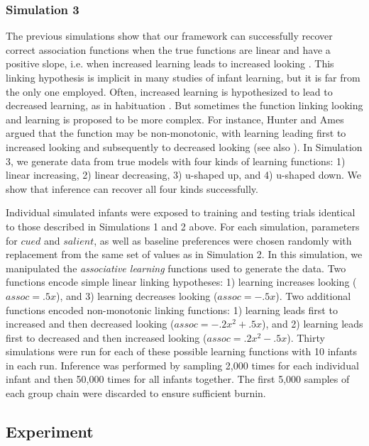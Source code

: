 \documentclass[12pt]{article}
\begin{document}
\subsubsection*{Simulation 3}

	The previous simulations show that our framework can successfully recover correct association functions when the true functions are linear and have a positive slope, i.e. when increased learning leads to increased looking \cite{Yu2011a}. This linking hypothesis is implicit in many studies of infant learning, but it is far from the only one employed. Often, increased learning is hypothesized to lead to decreased learning, as in habituation \cite{Fantz1964, Stager1997, Gilmore2002}. But sometimes the function linking looking and learning is proposed to be more complex. For instance, Hunter and Ames \cite{Hunter1988} argued that the function may be non-monotonic, with learning leading first to increased looking and subsequently to decreased looking (see also \cite{Cohen2004, Houston-Price2004}). In Simulation 3, we generate data from true models with four kinds of learning functions: 1) linear increasing, 2) linear decreasing, 3) u-shaped up, and 4) u-shaped down. We show that inference can recover all four kinds successfully. 

	Individual simulated infants were exposed to training and testing trials identical to those described in Simulations 1 and 2 above. For each simulation, parameters for $cued$ and $salient$, as well as baseline preferences were chosen randomly with replacement from the same set of values as in Simulation 2. In this simulation, we manipulated the \emph{associative learning} functions used to generate the data. Two functions encode simple linear linking hypotheses: 1) learning increases looking ($assoc = .5x$), and 3) learning decreases looking ($assoc = -.5x$). Two additional functions encoded non-monotonic linking functions: 1) learning leads first to increased and then decreased looking ($assoc = -.2x^{2} + .5x$), and 2) learning leads first to decreased and then increased looking ($assoc = .2x^{2} - .5x$). Thirty simulations were run for each of these possible learning functions with 10 infants in each run. Inference was performed by sampling 2,000 times for each individual infant and then 50,000 times for all infants together. The first 5,000 samples of each group chain were discarded to ensure sufficient burnin.

\subsection*{Experiment}
\end{document}
